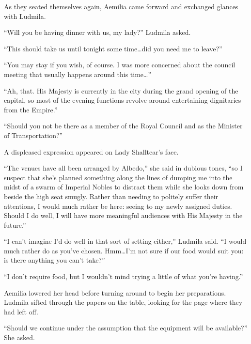  

As they seated themselves again, Aemilia came forward and exchanged glances with Ludmila.

 

“Will you be having dinner with us, my lady?” Ludmila asked.

 

“This should take us until tonight some time…did you need me to leave?”

 

“You may stay if you wish, of course. I was more concerned about the council meeting that usually happens around this time…”

 

“Ah, that. His Majesty is currently in the city during the grand opening of the capital, so most of the evening functions revolve around entertaining dignitaries from the Empire.”

 

“Should you not be there as a member of the Royal Council and as the Minister of Transportation?”

 

A displeased expression appeared on Lady Shalltear’s face.

 

“The venues have all been arranged by Albedo,” she said in dubious tones, “so I suspect that she’s planned something along the lines of dumping me into the midst of a swarm of Imperial Nobles to distract them while she looks down from beside the high seat smugly. Rather than needing to politely suffer their attentions, I would much rather be here: seeing to my newly assigned duties. Should I do well, I will have more meaningful audiences with His Majesty in the future.”

 

“I can’t imagine I’d do well in that sort of setting either,” Ludmila said. “I would much rather do as you’ve chosen. Hmm…I’m not sure if our food would suit you: is there anything you can’t take?”

 

“I don’t require food, but I wouldn’t mind trying a little of what you’re having.”

 

Aemilia lowered her head before turning around to begin her preparations. Ludmila sifted through the papers on the table, looking for the page where they had left off.

 

“Should we continue under the assumption that the equipment will be available?” She asked.

